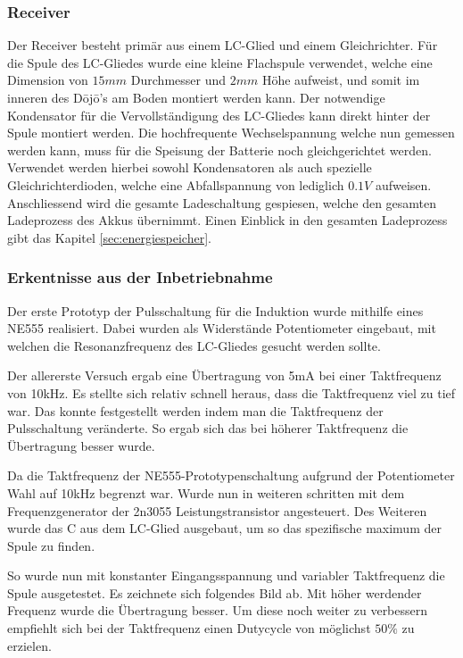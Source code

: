 \subsubsection*{Receiver}
Der Receiver besteht primär aus einem LC-Glied und einem Gleichrichter. Für die Spule des LC-Gliedes wurde eine kleine Flachspule verwendet, welche eine Dimension von $15mm$ Durchmesser und $2mm$ Höhe aufweist, und somit im inneren des Dōjō’s am Boden montiert werden kann. Der notwendige Kondensator für die Vervollständigung des LC-Gliedes kann direkt hinter der Spule montiert werden. Die hochfrequente Wechselspannung welche nun gemessen werden kann, muss für die Speisung der Batterie noch gleichgerichtet werden. Verwendet werden hierbei sowohl Kondensatoren als auch spezielle Gleichrichterdioden, welche eine Abfallspannung von lediglich $0.1V$ aufweisen. Anschliessend wird die gesamte Ladeschaltung gespiesen, welche den gesamten Ladeprozess des Akkus übernimmt. Einen Einblick in den gesamten Ladeprozess gibt das Kapitel \ref{sec:energiespeicher}.

\subsubsection*{Erkentnisse aus der Inbetriebnahme}\label{sec:erkenntnisse}

Der erste Prototyp der Pulsschaltung für die Induktion wurde mithilfe eines NE555 realisiert. Dabei wurden als Widerstände Potentiometer eingebaut, mit welchen die Resonanzfrequenz des LC-Gliedes gesucht werden sollte.

Der allererste Versuch ergab eine Übertragung von 5mA bei einer Taktfrequenz von 10kHz. Es stellte sich relativ schnell heraus, dass die Taktfrequenz viel zu tief war. Das konnte festgestellt werden indem man die Taktfrequenz der Pulsschaltung veränderte. So ergab sich das bei höherer Taktfrequenz die Übertragung besser wurde.

Da die Taktfrequenz der NE555-Prototypenschaltung aufgrund der Potentiometer Wahl auf 10kHz begrenzt war. Wurde nun in weiteren schritten mit dem Frequenzgenerator der 2n3055 Leistungstransistor angesteuert. Des Weiteren wurde das C aus dem LC-Glied ausgebaut, um so das spezifische maximum der Spule zu finden.

So wurde nun mit konstanter Eingangsspannung und variabler Taktfrequenz die Spule ausgetestet. Es zeichnete sich folgendes Bild ab. Mit höher werdender Frequenz wurde die Übertragung besser. Um diese noch weiter zu verbessern empfiehlt sich bei der Taktfrequenz einen Dutycycle von möglichst $50\%$ zu erzielen.

